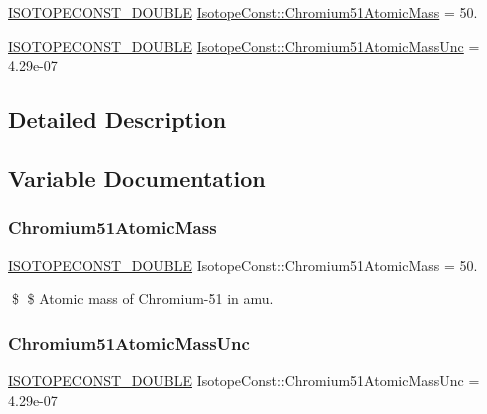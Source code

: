\begin{DoxyCompactItemize}
\item 
\mbox{\hyperlink{group___isotope_const-_macros_ga8f45a7272ce02c0b4c65c44636ed719a}{I\+S\+O\+T\+O\+P\+E\+C\+O\+N\+S\+T\+\_\+\+D\+O\+U\+B\+LE}} \mbox{\hyperlink{group___isotope_const-_chromium-_cr51_gab1ad410e30e94a4c2408e26bc0f5c93a}{Isotope\+Const\+::\+Chromium51\+Atomic\+Mass}} = 50.
\item 
\mbox{\hyperlink{group___isotope_const-_macros_ga8f45a7272ce02c0b4c65c44636ed719a}{I\+S\+O\+T\+O\+P\+E\+C\+O\+N\+S\+T\+\_\+\+D\+O\+U\+B\+LE}} \mbox{\hyperlink{group___isotope_const-_chromium-_cr51_ga27a4925e1240d079c146d13f6a695a78}{Isotope\+Const\+::\+Chromium51\+Atomic\+Mass\+Unc}} = 4.\+29e-\/07
\end{DoxyCompactItemize}


\subsection{Detailed Description}


\subsection{Variable Documentation}
\mbox{\label{group___isotope_const-_chromium-_cr51_gab1ad410e30e94a4c2408e26bc0f5c93a}} 
\subsubsection{\texorpdfstring{Chromium51\+Atomic\+Mass}{Chromium51AtomicMass}}
{\footnotesize\ttfamily \mbox{\hyperlink{group___isotope_const-_macros_ga8f45a7272ce02c0b4c65c44636ed719a}{I\+S\+O\+T\+O\+P\+E\+C\+O\+N\+S\+T\+\_\+\+D\+O\+U\+B\+LE}} Isotope\+Const\+::\+Chromium51\+Atomic\+Mass = 50.}

\$ \$ Atomic mass of Chromium-\/51 in amu. \mbox{\label{group___isotope_const-_chromium-_cr51_ga27a4925e1240d079c146d13f6a695a78}} 
\subsubsection{\texorpdfstring{Chromium51\+Atomic\+Mass\+Unc}{Chromium51AtomicMassUnc}}
{\footnotesize\ttfamily \mbox{\hyperlink{group___isotope_const-_macros_ga8f45a7272ce02c0b4c65c44636ed719a}{I\+S\+O\+T\+O\+P\+E\+C\+O\+N\+S\+T\+\_\+\+D\+O\+U\+B\+LE}} Isotope\+Const\+::\+Chromium51\+Atomic\+Mass\+Unc = 4.\+29e-\/07}

